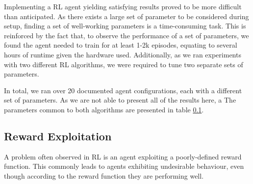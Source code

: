 Implementing a RL agent yielding satisfying results proved to be more difficult than anticipated.
As there exists a large set of parameter to be considered during setup, finding a set of well-working parameters is a time-consuming task.
This is reinforced by the fact that, to observe the performance of a set of parameters, we found the agent needed to train for at least 1-2k episodes, equating to several hours of runtime given the hardware used.
Additionally, as we ran experiments with two different RL algorithms, we were required to tune two separate sets of parameters.

In total, we ran over 20 documented agent configurations, each with a different set of parameters.
As we are not able to present all of the results here, a 
The parameters common to both algorithms are presented in table \ref{}.

\subsection{Reward Exploitation}
A problem often observed in RL is an agent exploiting a poorly-defined reward function.
This commonly leads to agents exhibiting undesirable behaviour, even though according to the reward function they are performing well.

